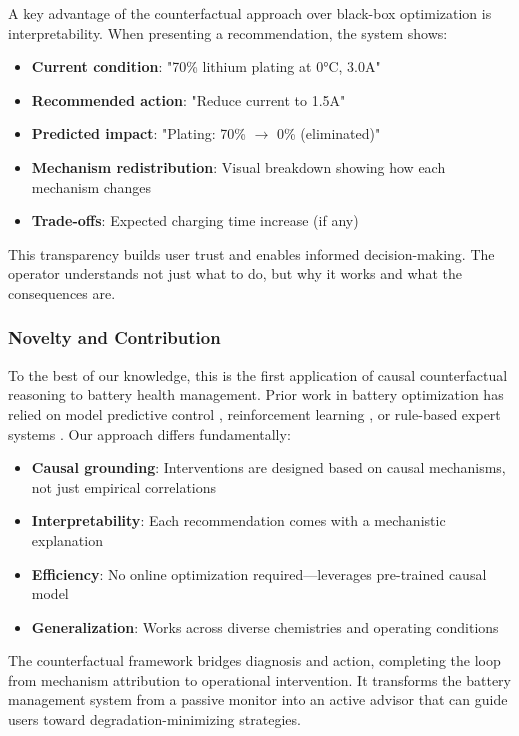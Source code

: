 \documentclass[5p,times,authoryear]{elsarticle}
\begin{document}
A key advantage of the counterfactual approach over black-box optimization is interpretability. When presenting a recommendation, the system shows:

\begin{itemize}
\item \textbf{Current condition}: "70\% lithium plating at 0°C, 3.0A"
\item \textbf{Recommended action}: "Reduce current to 1.5A"
\item \textbf{Predicted impact}: "Plating: 70\% $\rightarrow$ 0\% (eliminated)"
\item \textbf{Mechanism redistribution}: Visual breakdown showing how each mechanism changes
\item \textbf{Trade-offs}: Expected charging time increase (if any)
\end{itemize}

This transparency builds user trust and enables informed decision-making. The operator understands not just what to do, but why it works and what the consequences are.

\subsubsection{Novelty and Contribution}

To the best of our knowledge, this is the first application of causal counterfactual reasoning to battery health management. Prior work in battery optimization has relied on model predictive control \citep{torchio2016lionsimba}, reinforcement learning \citep{chen2020reinforcement}, or rule-based expert systems \citep{xiong2018towards}. Our approach differs fundamentally:

\begin{itemize}
\item \textbf{Causal grounding}: Interventions are designed based on causal mechanisms, not just empirical correlations
\item \textbf{Interpretability}: Each recommendation comes with a mechanistic explanation
\item \textbf{Efficiency}: No online optimization required---leverages pre-trained causal model
\item \textbf{Generalization}: Works across diverse chemistries and operating conditions
\end{itemize}

The counterfactual framework bridges diagnosis and action, completing the loop from mechanism attribution to operational intervention. It transforms the battery management system from a passive monitor into an active advisor that can guide users toward degradation-minimizing strategies.
\end{document}
